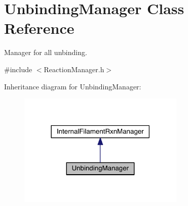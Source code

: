 \hypertarget{classUnbindingManager}{\section{Unbinding\+Manager Class Reference}
\label{classUnbindingManager}
}


Manager for all unbinding.  




{\ttfamily \#include $<$Reaction\+Manager.\+h$>$}



Inheritance diagram for Unbinding\+Manager\+:\nopagebreak
\begin{figure}[H]
\begin{center}
\leavevmode
\includegraphics[width=225pt]{classUnbindingManager__inherit__graph}
\end{center}
\end{figure}


